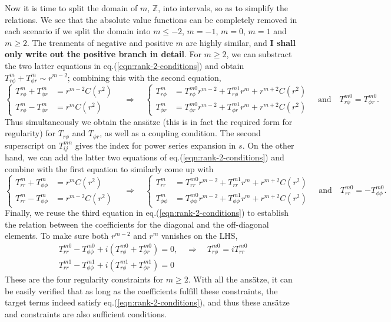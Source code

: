 \documentclass[a4paper, 11pt]{article}
\begin{document}
Now it is time to split the domain of $m$, $\mathbb{Z}$, into intervals, so as to simplify the relations. We see that the absolute value functions can be completely removed in each scenario if we split the domain into $m \leq -2$, $m=-1$, $m=0$, $m=1$ and $m\geq 2$. The treaments of negative and positive $m$ are highly similar, and \textbf{I shall only write out the positive branch in detail}. For $m\geq 2$, we can substract the two latter equations in eq.(\ref{eqn:rank-2-conditions}) and obtain $T_{r\phi}^m + T_{\phi r}^m \sim r^{m-2}$; combining this with the second equation,
\[
\left\{\begin{aligned}
    T_{r\phi}^m + T_{\phi r}^m &= r^{m-2} C(r^2) \\ 
    T_{r\phi}^m - T_{\phi r}^m &= r^m C(r^2)
\end{aligned}\right. \quad \Longrightarrow\quad 
\left\{\begin{aligned}
    T_{r\phi}^m &= T_{r\phi}^{m0} r^{m-2} + T_{r\phi}^{m1} r^{m} + r^{m+2} C(r^2) \\ 
    T_{\phi r}^m &= T_{\phi r}^{m0} r^{m-2} + T_{\phi r}^{m1} r^{m} + r^{m+2} C(r^2) 
\end{aligned}\right. \quad \mathrm{and} \quad T_{r\phi}^{m0} = T_{\phi r}^{m0}.
\]
Thus simultaneously we obtain the ansätze (this is in fact the required form for regularity) for $T_{r\phi}$ and $T_{\phi r}$, as well as a coupling condition. The second superscript on $T_{ij}^{mn}$ gives the index for power series expansion in $s$. On the other hand, we can add the latter two equations of eq.(\ref{eqn:rank-2-conditions}) and combine with the first equation to similarly come up with 
\[
\left\{\begin{aligned}
    T_{rr}^m + T_{\phi \phi}^m &= r^{m} C(r^2) \\ 
    T_{rr}^m - T_{\phi \phi}^m &= r^{m-2} C(r^2)
\end{aligned}\right. \quad \Longrightarrow\quad 
\left\{\begin{aligned}
    T_{rr}^m &= T_{rr}^{m0} r^{m-2} + T_{rr}^{m1} r^{m} + r^{m+2} C(r^2) \\ 
    T_{\phi \phi}^m &= T_{\phi\phi}^{m0} r^{m-2} + T_{\phi\phi}^{m1} r^{m} + r^{m+2} C(r^2) 
\end{aligned}\right. \quad \mathrm{and} \quad T_{rr}^{m0} = - T_{\phi\phi}^{m0}.
\]
Finally, we reuse the third equation in eq.(\ref{eqn:rank-2-conditions}) to establish the relation between the coefficients for the diagonal and the off-diagonal elements. To make sure both $r^{m-2}$ and $r^m$ vanishes on the LHS,
\[
\begin{aligned}
    T_{rr}^{m0} - T_{\phi\phi}^{m0} + i \left(T_{r\phi}^{m0} + T_{\phi r}^{m0}\right) = 0, \quad \Longrightarrow\quad T_{r\phi}^{m0} = i T_{rr}^{m0} \\
    T_{rr}^{m1} - T_{\phi\phi}^{m1} + i \left(T_{r\phi}^{m1} + T_{\phi r}^{m1}\right) = 0
\end{aligned}
\]
These are the four regularity constraints for $m\geq 2$. With all the ansätze, it can be easily verified that as long as the coefficients fulfill these constraints, the target terms indeed satisfy eq.(\ref{eqn:rank-2-conditions}), and thus these ansätze and constraints are also sufficient conditions.
\end{document}
